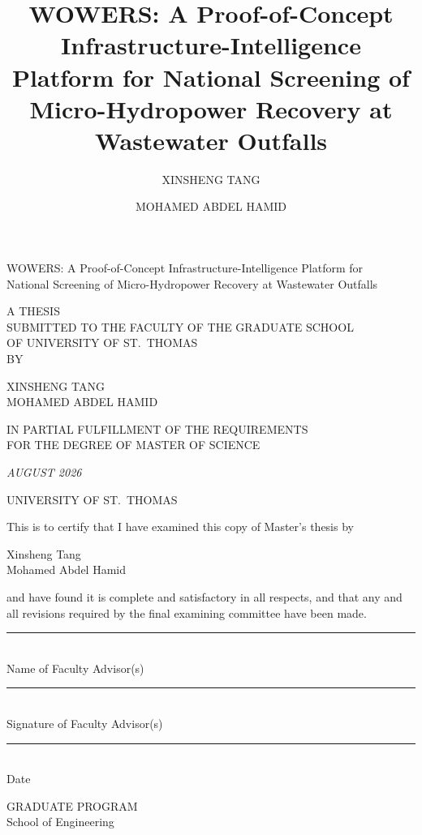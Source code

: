 \documentclass[12pt,letterpaper]{report}
\title{WOWERS: A Proof-of-Concept Infrastructure-Intelligence Platform for National
Screening of Micro-Hydropower Recovery at Wastewater Outfalls}
\author{XINSHENG TANG \and MOHAMED ABDEL HAMID}
\date{} %
\begin{document}
\begin{titlepage}\centering
  {\large WOWERS: A Proof-of-Concept Infrastructure-Intelligence Platform for\\
   National Screening of Micro-Hydropower Recovery at Wastewater Outfalls\par}
  \vspace{2cm}
  A THESIS\\ SUBMITTED TO THE FACULTY OF THE GRADUATE SCHOOL\\
  OF UNIVERSITY OF ST.\ THOMAS\\ BY\par
  \vspace{1cm}
  XINSHENG TANG\\ MOHAMED ABDEL HAMID\par
  \vspace{1cm}
  IN PARTIAL FULFILLMENT OF THE REQUIREMENTS\\
  FOR THE DEGREE OF MASTER OF SCIENCE\par
  \vspace{1cm}
  {\itshape AUGUST 2026}\par
\end{titlepage}


\thispagestyle{empty}
\noindent UNIVERSITY OF ST.\ THOMAS\par\vspace{1em}
\noindent This is to certify that I have examined this copy of Master's thesis by\par
\vspace{1em}\noindent Xinsheng Tang\\ Mohamed Abdel Hamid\par
\vspace{1em}\noindent and have found it is complete and satisfactory in all respects,
and that any and all revisions required by the final examining committee have been made.
\par\vspace{2em}
\noindent\rule{6cm}{0.4pt}\\ Name of Faculty Advisor(s)\par\vspace{1.5em}
\noindent\rule{8cm}{0.4pt}\\ Signature of Faculty Advisor(s)\par\vspace{1.5em}
\noindent\rule{8cm}{0.4pt}\\ Date\par\vspace{2em}
\noindent GRADUATE PROGRAM\\ School of Engineering\par
\clearpage
\end{document}
